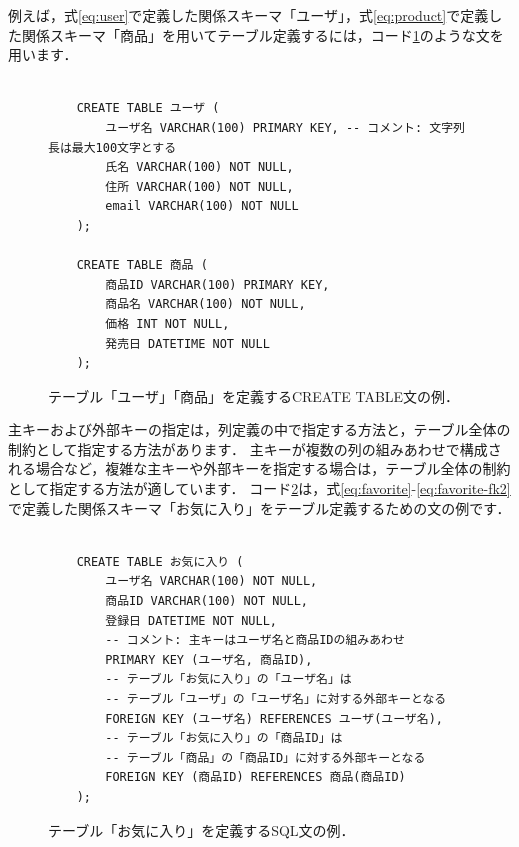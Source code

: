 例えば，式\ref{eq:user}で定義した関係スキーマ「ユーザ」，式\ref{eq:product}で定義した関係スキーマ「商品」を用いてテーブル定義するには，コード\ref{code:create-table}のような文を用います．
\begin{figure}[!htbp]
    \begin{verbatim}

    CREATE TABLE ユーザ (
        ユーザ名 VARCHAR(100) PRIMARY KEY, -- コメント: 文字列長は最大100文字とする
        氏名 VARCHAR(100) NOT NULL,
        住所 VARCHAR(100) NOT NULL,
        email VARCHAR(100) NOT NULL
    );

    CREATE TABLE 商品 (
        商品ID VARCHAR(100) PRIMARY KEY,
        商品名 VARCHAR(100) NOT NULL,
        価格 INT NOT NULL,
        発売日 DATETIME NOT NULL
    );

    \end{verbatim}
    \captionsetup{name=コード}
    \caption{テーブル「ユーザ」「商品」を定義するCREATE TABLE文の例．}
    \label{code:create-table}
\end{figure}

主キーおよび外部キーの指定は，列定義の中で指定する方法と，テーブル全体の制約として指定する方法があります．
主キーが複数の列の組みあわせで構成される場合など，複雑な主キーや外部キーを指定する場合は，テーブル全体の制約として指定する方法が適しています．
コード\ref{code:create-table2}は，式\ref{eq:favorite}-\ref{eq:favorite-fk2}で定義した関係スキーマ「お気に入り」をテーブル定義するための文の例です．
\begin{figure}[!htbp]
    \begin{verbatim}

    CREATE TABLE お気に入り (
        ユーザ名 VARCHAR(100) NOT NULL,
        商品ID VARCHAR(100) NOT NULL,
        登録日 DATETIME NOT NULL,
        -- コメント: 主キーはユーザ名と商品IDの組みあわせ
        PRIMARY KEY (ユーザ名, 商品ID),
        -- テーブル「お気に入り」の「ユーザ名」は
        -- テーブル「ユーザ」の「ユーザ名」に対する外部キーとなる
        FOREIGN KEY (ユーザ名) REFERENCES ユーザ(ユーザ名),
        -- テーブル「お気に入り」の「商品ID」は
        -- テーブル「商品」の「商品ID」に対する外部キーとなる
        FOREIGN KEY (商品ID) REFERENCES 商品(商品ID)
    );

    \end{verbatim}
    \captionsetup{name=コード}
    \caption{テーブル「お気に入り」を定義するSQL文の例．}
    \label{code:create-table2}
\end{figure}


